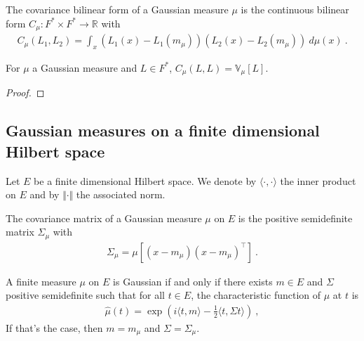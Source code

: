 \begin{definition}[Covariance]\label{def:covarianceBilin}
The covariance bilinear form of a Gaussian measure $\mu$ is the continuous bilinear form $C_\mu : F^* \times F^* \to \mathbb{R}$ with
\begin{align*}
  C_\mu(L_1, L_2) = \int_x (L_1(x) - L_1(m_\mu)) (L_2(x) - L_2(m_\mu)) \: d\mu(x) \: .
\end{align*}
\end{definition}


\begin{lemma}\label{lem:covarianceBilin_same_eq_variance}
For $\mu$ a Gaussian measure and $L \in F^*$, $C_\mu(L, L) = \mathbb{V}_\mu[L]$.
\end{lemma}

\begin{proof}

\end{proof}


\subsection{Gaussian measures on a finite dimensional Hilbert space}

Let $E$ be a finite dimensional Hilbert space. We denote by $\langle \cdot, \cdot \rangle$ the inner product on $E$ and by $\Vert \cdot \Vert$ the associated norm.


\begin{definition}\label{def:covMatix}
The covariance matrix of a Gaussian measure $\mu$ on $E$ is the positive semidefinite matrix $\Sigma_\mu$ with
\begin{align*}
  \Sigma_\mu = \mu[(x - m_\mu) (x - m_\mu)^\top] \: .
\end{align*}
\end{definition}


\begin{lemma}\label{lem:isGaussian_iff_charFun_eq}
A finite measure $\mu$ on $E$ is Gaussian if and only if there exists $m \in E$ and $\Sigma$ positive semidefinite such that for all $t \in E$, the characteristic function of $\mu$ at $t$ is
\begin{align*}
  \hat{\mu}(t) = \exp\left(i \langle t, m \rangle - \frac{1}{2} \langle t, \Sigma t \rangle\right) \: ,
\end{align*}
If that's the case, then $m = m_\mu$ and $\Sigma = \Sigma_\mu$.
\end{lemma}

